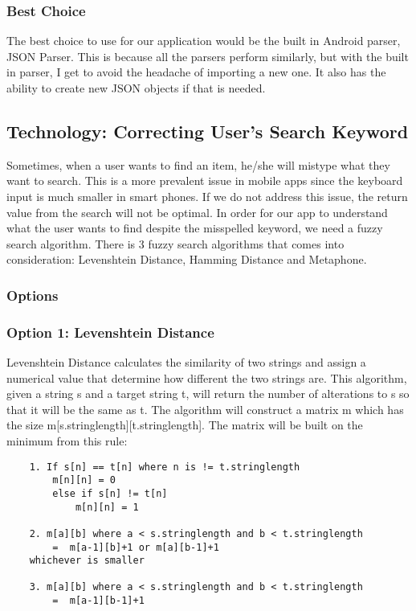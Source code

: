 \documentclass[journal,compsoc, 10pt, draftclsnofoot, onecolumn]{IEEEtran}
\begin{document}
\subsubsection{Best Choice}
The best choice to use for our application would be the built in Android parser,
JSON Parser. This is because all the parsers perform similarly, but with the
built in parser, I get to avoid the headache of importing a new one. It also has
the ability to create new JSON objects if that is needed.

\subsection{Technology: Correcting User's Search Keyword}
Sometimes, when a user wants to find an item, he/she will mistype what they want to
search. This is a more prevalent issue in mobile apps since the keyboard input is
much smaller in smart phones. If we do not address this issue, the return value from
the search will not be optimal. In order for our app to understand what the user
wants to find despite the misspelled keyword, we need a fuzzy search algorithm.
There is 3 fuzzy search algorithms that comes into consideration: Levenshtein
Distance, Hamming Distance and Metaphone.

\subsubsection{Options}
\subsubsection*{Option 1: Levenshtein Distance}
Levenshtein Distance calculates the similarity of two strings and assign a numerical
value that determine how different the two strings are. This algorithm, given a
string s and a target string t, will return the number of alterations to s so that it
will be the same as t. The algorithm will construct a matrix m which has the size
m[s.stringlength][t.stringlength]. The matrix will be built on the minimum from this
rule:

\begin{lstlisting}
	1. If s[n] == t[n] where n is != t.stringlength 
		m[n][n] = 0 
		else if s[n] != t[n] 
			m[n][n] = 1
	
	2. m[a][b] where a < s.stringlength and b < t.stringlength 
		=  m[a-1][b]+1 or m[a][b-1]+1 
	whichever is smaller
	
	3. m[a][b] where a < s.stringlength and b < t.stringlength 
		=  m[a-1][b-1]+1
\end{lstlisting}
\end{document}

